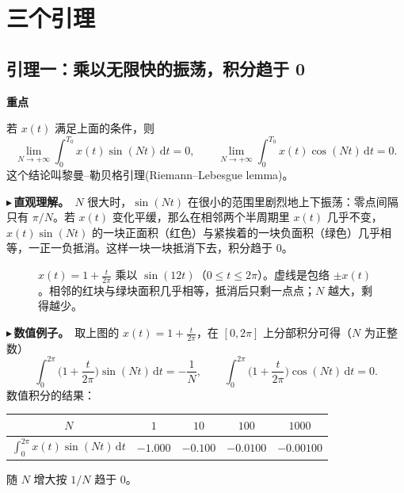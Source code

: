 \documentclass[UTF8,a4paper,11pt]{ctexart}
\newenvironment{remember}{\begin{rememberbox}\textbf{重点}\par\smallskip}{\end{rememberbox}}
\newcommand{\taxes}[5][t]{%
  \draw[->] (#2,0) -- (#3,0) node[right,font=\scriptsize] {$#1$};
  \draw[->] (0,#5) -- (0,#4);
  \node[anchor=north east,font=\tiny,gray!60!black,inner sep=1pt] at (0,-0.02) {$0$};}
\newcommand{\xtu}[2]{\draw (#1,0) -- (#1,0.1) node[anchor=south,font=\tiny,gray!60!black,fill=white,inner sep=0.6pt] {$#2$};}
\newcommand{\yt}[2]{\draw (0,#1) -- (-0.1,#1) node[anchor=east,font=\tiny,gray!60!black,fill=white,inner sep=0.6pt] {$#2$};}
\newcounter{ex}[section]
\newcommand{\point}[1]{\par\addvspace{1ex}\noindent\textcolor{ptteal}{$\blacktriangleright$\,\textbf{#1}}\ }
\begin{document}
\section{三个引理}\label{sec:lemma}

\subsection{引理一：乘以无限快的振荡，积分趋于 0}\label{sub:lemma1}
\begin{remember}
若 $x(t)$ 满足上面的条件，则
\[
\lim_{N\to+\infty}\int_0^{T_0}x(t)\sin(Nt)\,\mathrm{d}t=0,\qquad
\lim_{N\to+\infty}\int_0^{T_0}x(t)\cos(Nt)\,\mathrm{d}t=0 .
\]
这个结论叫黎曼--勒贝格引理(Riemann--Lebesgue lemma)。
\end{remember}

\point{直观理解。}$N$ 很大时，$\sin(Nt)$ 在很小的范围里剧烈地上下振荡：零点间隔只有 $\pi/N$。若 $x(t)$ 变化平缓，那么在相邻两个半周期里 $x(t)$ 几乎不变，$x(t)\sin(Nt)$ 的一块正面积（红色）与紧挨着的一块负面积（绿色）几乎相等，一正一负抵消。这样一块一块抵消下去，积分趋于 $0$。

\begin{figure}[H]
\centering
{}
\caption{$x(t)=1+\frac{t}{2\pi}$ 乘以 $\sin(12t)$（$0\le t\le 2\pi$）。虚线是包络 $\pm x(t)$。相邻的红块与绿块面积几乎相等，抵消后只剩一点点；$N$ 越大，剩得越少。}
\end{figure}

\point{数值例子。}取上图的 $x(t)=1+\frac{t}{2\pi}$，在 $[0,2\pi]$ 上分部积分可得（$N$ 为正整数）
\[
\int_0^{2\pi}\Big(1+\frac{t}{2\pi}\Big)\sin(Nt)\,\mathrm{d}t=-\frac{1}{N},\qquad
\int_0^{2\pi}\Big(1+\frac{t}{2\pi}\Big)\cos(Nt)\,\mathrm{d}t=0 .
\]
数值积分的结果：
\begin{center}
\begin{tabular}{ccccc}
\toprule
$N$ & $1$ & $10$ & $100$ & $1000$\\
\midrule
$\int_0^{2\pi}x(t)\sin(Nt)\,\mathrm{d}t$ & $-1.000$ & $-0.100$ & $-0.0100$ & $-0.00100$\\
\bottomrule
\end{tabular}
\end{center}
随 $N$ 增大按 $1/N$ 趋于 $0$。
\end{document}
